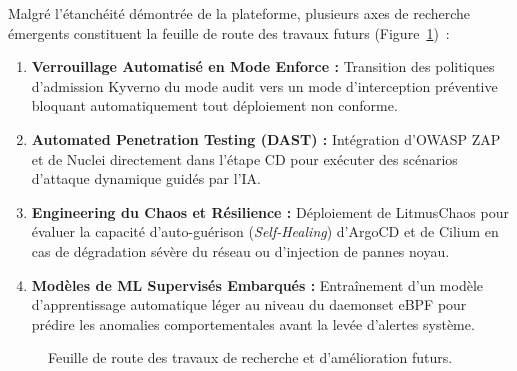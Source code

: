 Malgré l'étanchéité démontrée de la plateforme, plusieurs axes de recherche émergents constituent la feuille de route des travaux futurs (Figure~\ref{fig:perspectives_amelioration_full_sec})~:
\begin{enumerate}
    \item \textbf{Verrouillage Automatisé en Mode Enforce : } Transition des politiques d'admission Kyverno du mode audit vers un mode d'interception préventive bloquant automatiquement tout déploiement non conforme.
    \item \textbf{Automated Penetration Testing (DAST) : } Intégration d'OWASP ZAP et de Nuclei directement dans l'étape CD pour exécuter des scénarios d'attaque dynamique guidés par l'IA.
    \item \textbf{Engineering du Chaos et Résilience : } Déploiement de LitmusChaos pour évaluer la capacité d'auto-guérison (\textit{Self-Healing}) d'ArgoCD et de Cilium en cas de dégradation sévère du réseau ou d'injection de pannes noyau.
    \item \textbf{Modèles de ML Supervisés Embarqués : } Entraînement d'un modèle d'apprentissage automatique léger au niveau du daemonset eBPF pour prédire les anomalies comportementales avant la levée d'alertes système.
\end{enumerate}

\begin{figure}[htbp]
\centering
\scriptsize
{}
\caption{Feuille de route des travaux de recherche et d'amélioration futurs.}
\label{fig:perspectives_amelioration_full_sec}
\end{figure}

